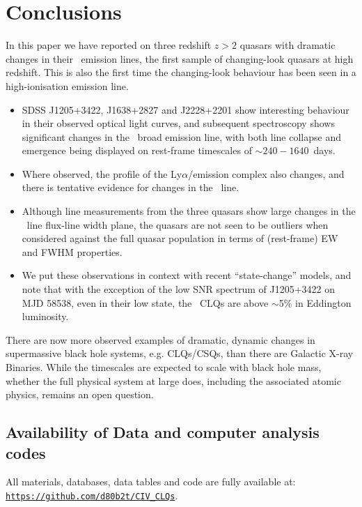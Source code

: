 \documentclass[fleqn,usenatbib]{mnras}
\begin{document}
\section{Conclusions}
In this paper we have reported on three redshift $z>2$ quasars with
dramatic changes in their \civ\ emission lines, the first sample of
changing-look quasars at high redshift.  This is also the first time
the changing-look behaviour has been seen in a high-ionisation
emission line.

\begin{itemize}
\item SDSS J1205+3422, J1638+2827 and J2228+2201 show interesting
  behaviour in their observed optical light curves, and subsequent
  spectroscopy shows significant changes in the \civ\ broad emission
  line, with both line collapse and emergence being displayed on
  rest-frame timescales of $\sim 240-1640$~days.
\item Where observed, the profile of the Ly$\alpha$/\nv emission complex
  also changes, and there is tentative evidence for changes in the \mgii\
  line.
\item Although line measurements from the three quasars show large changes
  in the \civ\ line flux-line width plane, the quasars are not seen to
  be outliers when considered against the full quasar population
  in terms of (rest-frame) EW and FWHM properties.
\item 
  We put these observations in context with recent ``state-change''
  models, and note that with the exception of the low SNR spectrum of
  J1205+3422 on MJD 58538, even in their low state, 
  the \civ\ CLQs are above $\sim$5\% in Eddington luminosity. 
\end{itemize}

There are now more observed examples of dramatic, dynamic changes in
supermassive black hole systems, e.g. CLQs/CSQs, than there are
Galactic X-ray Binaries.  While the timescales are expected to scale
with black hole mass, whether the full physical system at large does,
including the associated atomic physics, remains an open question.


\subsection*{Availability of Data and computer analysis codes} 
All materials, databases, data tables and code are fully available at: 
\href{https://github.com/d80b2t/CIV_CLQs}{\tt https://github.com/d80b2t/CIV\_CLQs}.
\end{document}
